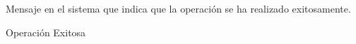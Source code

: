 Mensaje en el sistema que indica que la operación se ha realizado exitosamente.

  \noindent Operación Exitosa

















